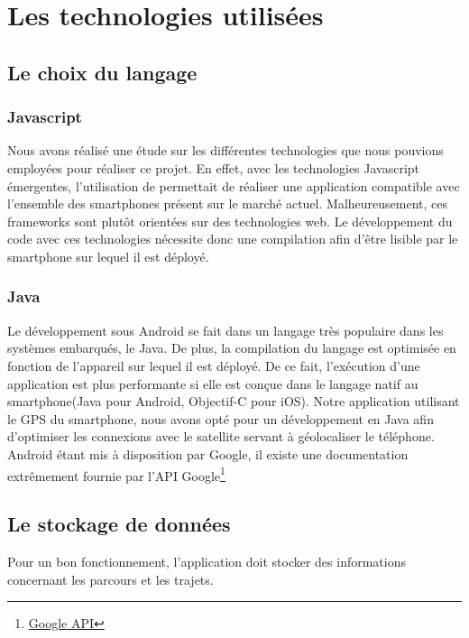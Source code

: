 \chapter{Les technologies utilisées}
\section{Le choix du langage}

\subsection{Javascript}
Nous avons réalisé une étude sur les différentes technologies que nous pouvions employées pour réaliser ce projet. En effet, avec les technologies Javascript émergentes, l'utilisation de  permettait de réaliser une application compatible avec l'ensemble des smartphones présent sur le marché actuel. Malheureusement, ces frameworks sont plutôt orientées sur des technologies web. Le développement du code avec ces technologies nécessite donc une compilation afin d'être lisible par le smartphone sur lequel il est déployé. 

\subsection{Java}
Le développement sous Android se fait dans un langage très populaire dans les systèmes embarqués, le Java. De plus, la compilation du langage est optimisée en fonction de l’appareil sur lequel il est déployé. De ce fait, l’exécution d'une application est plus performante si elle est conçue dans le langage natif au smartphone(Java pour Android, Objectif-C pour iOS). Notre application utilisant le GPS du smartphone, nous avons opté pour un développement en Java afin d'optimiser les connexions avec le satellite servant à géolocaliser le téléphone. Android étant mis à disposition par Google, il existe une documentation extrêmement fournie par l'API Google\footnote{\href{http://developer.android.com/index.html}{Google API}}

\section{Le stockage de données}
Pour un bon fonctionnement, l'application doit stocker des informations concernant les parcours et les trajets. 

